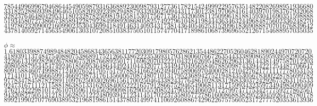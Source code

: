 \documentclass{tufte-book}
\begin{document}
$7854499699679468644549059879316368892300987931277361782154249992295763514822082698951936680$\\
$3318252886939849646510582093923982948879332036250944311730123819706841614039701983767932068$\\
$3282376464804295311802328782509819455815301756717361332069811250996181881593041690351598888$\\
$5193458072738667385894228792284998920868058257492796104841984443634632449684875602336248270$\\
$4197862320900216099023530436994184914631409343173814364054625315209618369088870701676839642$\\
$4378140592714563549061303107208510383750510115747704171898610687396965521267154688957035035$
\\~\\
$\phi\approx$\\
$1.61803398874989484820458683436563811772030917980576286213544862270526046281890244970720720$\\
$4189391137484754088075386891752126633862223536931793180060766726354433389086595939582905638$\\
$3226613199282902678806752087668925017116962070322210432162695486262963136144381497587012203$\\
$4080588795445474924618569536486444924104432077134494704956584678850987433944221254487706647$\\
$8091588460749988712400765217057517978834166256249407589069704000281210427621771117778053153$\\
$1714101170466659914669798731761356006708748071013179523689427521948435305678300228785699782$\\
$9778347845878228911097625003026961561700250464338243776486102838312683303724292675263116533$\\
$9247316711121158818638513316203840052221657912866752946549068113171599343235973494985090409$\\
$4762132229810172610705961164562990981629055520852479035240602017279974717534277759277862561$\\
$9432082750513121815628551222480939471234145170223735805772786160086883829523045926478780178$\\
$8992199027077690389532196819861514378031499741106926088674296226757560523172777520353613936$

\mainmatter



\end{document}
